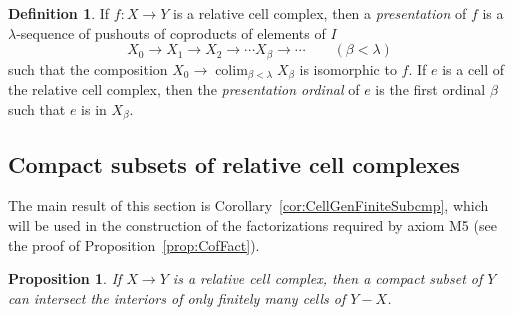 \documentclass[12pt]{amsart}
\numberwithin{equation}{section}
\theoremstyle{slplain}
\newtheorem{prop}[equation]{Proposition}
\theoremstyle{definition}
\newtheorem{defn}[equation]{Definition} %
\theoremstyle{remark}
\newcommand{\propref}{Proposition~\ref}
\DeclareMathOperator*{\colim}{colim}
\begin{document}
\begin{defn}
  \label{def:presentation}
  If $f\colon X \to Y$ is a relative cell complex, then a
  \emph{presentation} of $f$ is a $\lambda$-sequence of pushouts of
  coproducts of elements of $I$
  \begin{displaymath}
    X_{0} \to X_{1} \to X_{2} \to \cdots X_{\beta} \to \cdots
    \qquad (\beta < \lambda)
  \end{displaymath}
  such that the composition $X_{0} \to \colim_{\beta <
    \lambda}X_{\beta}$ is isomorphic to $f$.  If $e$ is a cell of the
  relative cell complex, then the \emph{presentation ordinal} of $e$
  is the first ordinal $\beta$ such that $e$ is in $X_{\beta}$.
\end{defn}




\subsection{Compact subsets of relative cell complexes}
\label{sec:CmpctSubset}

The main result of this section is
Corollary~\ref{cor:CellGenFiniteSubcmp}, which will be used in the
construction of the factorizations required by axiom M5 (see the proof
of \propref{prop:CofFact}).

\begin{prop}
  \label{prop:RelCellCompSubset}
  If $X \to Y$ is a relative cell complex, then a compact subset of
  $Y$ can intersect the interiors of only finitely many cells of
  $Y-X$.
\end{prop}
\end{document}
